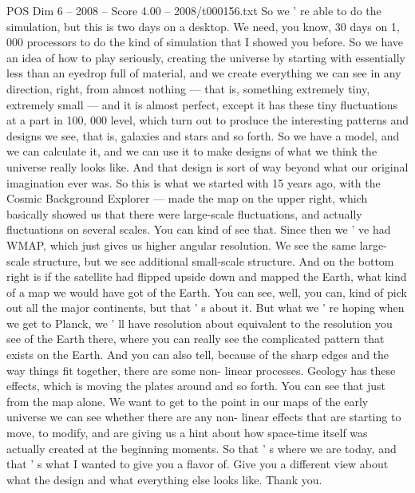 \begin{textsample}{POS Dim 6 – 2008 – Score 4.00 – 2008/t000156.txt}
So we ' re able to do the simulation, but this is two days on a desktop.
We need, you know, 30 days on 1, 000 processors to do the kind of simulation that I showed you before.
So we have an idea of how to play seriously, creating the universe by starting with essentially less than an eyedrop full of material, and we create everything we can see in any direction, right, from almost nothing — that is, something extremely tiny, extremely small — and it is almost perfect, except it has these tiny fluctuations at a part in 100, 000 level, which turn out to produce the interesting patterns and designs we see, that is, galaxies and stars and so forth.
So we have a model, and we can calculate it, and we can use it to make designs of what we think the universe really looks like.
And that design is sort of way beyond what our original imagination ever was.
So this is what we started with 15 years ago, with the Cosmic Background Explorer — made the map on the upper right, which basically showed us that there were large-scale fluctuations, and actually fluctuations on several scales.
You can kind of see that.
Since then we ' ve had WMAP, which just gives us higher angular resolution.
We see the same large-scale structure, but we see additional small-scale structure.
And on the bottom right is if the satellite had flipped upside down and mapped the Earth, what kind of a map we would have got of the Earth.
You can see, well, you can, kind of pick out all the major continents, but that ' s about it.
But what we ' re hoping when we get to Planck, we ' ll have resolution about equivalent to the resolution you see of the Earth there, where you can really see the complicated pattern that exists on the Earth.
And you can also tell, because of the sharp edges and the way things fit together, there are some non- linear processes.
Geology has these effects, which is moving the plates around and so forth.
You can see that just from the map alone.
We want to get to the point in our maps of the early universe we can see whether there are any non- linear effects that are starting to move, to modify, and are giving us a hint about how space-time itself was actually created at the beginning moments.
So that ' s where we are today, and that ' s what I wanted to give you a flavor of.
Give you a different view about what the design and what everything else looks like.
Thank you.

\end{textsample}

